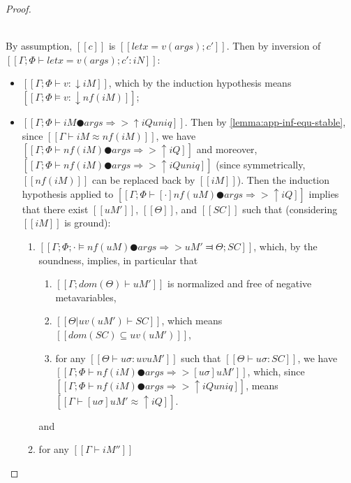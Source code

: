 \begin{proof}
\begin{caseof}
        \item {}\\
            By assumption, $[[c]]$ is $[[let x = v(args); c']]$. 
            Then by inversion of
            $[[Γ ; Φ ⊢ let x = v(args); c' : iN]]$: 
            \begin{itemize}
                \item $[[Γ ; Φ ⊢ v : ↓iM]]$, 
                    which by the induction hypothesis means 
                    $[[Γ; Φ ⊨ v : ↓nf(iM)]]$;
                \item $[[Γ ; Φ ⊢ iM ● args ⇒> ↑iQ uniq]]$. 
                    Then by \cref{lemma:app-inf-equ-stable}, since 
                    $[[Γ ⊢ iM ≈ nf(iM)]]$, we have
                    $[[Γ ; Φ ⊢ nf(iM) ● args ⇒> ↑iQ]]$
                    and moreover, $[[Γ ; Φ ⊢ nf(iM) ● args ⇒> ↑iQ uniq]]$
                    (since symmetrically, $[[nf(iM)]]$ can be replaced back by $[[iM]]$).
                    Then the induction hypothesis applied to 
                    $[[Γ ; Φ ⊢ [·]nf(uM) ● args ⇒> ↑iQ]]$
                    implies that there exist $[[uM']]$, $[[Θ]]$, and $[[SC]]$ such that
                    (considering $[[iM]]$ is ground):
                    \begin{enumerate}
                        \item $[[ Γ; Φ; · ⊨ nf(uM) ● args ⇒> uM' ⫤ Θ; SC ]]$, 
                            which, by the soundness, implies, in particular
                            that 
                            \begin{enumerate}
                                \item $[[Γ; dom(Θ) ⊢  uM']]$ is normalized and 
                                    free of negative metavariables, 
                                \item $[[Θ|uv(uM') ⊢ SC]]$, which means $[[dom(SC) ⊆ uv(uM')]]$,
                                \item \label{point:typing-completeness:AppLet:ih-sound} 
                                    for any $[[Θ ⊢ uσ : uv uM' ]]$ such that $[[ Θ ⊢ uσ : SC ]]$, 
                                    we have $[[ Γ ; Φ ⊢ nf(iM) ● args ⇒> [uσ]uM' ]]$,
                                    which, since $[[Γ ; Φ ⊢ nf(iM) ● args ⇒> ↑iQ uniq]]$,
                                    means $[[Γ ⊢ [uσ]uM' ≈ ↑iQ]]$.
                            \end{enumerate}
                            and
                        \item for any $[[Γ ⊢ iM'']]$

\end{enumerate}
\end{itemize}
\end{caseof}
\end{proof}

